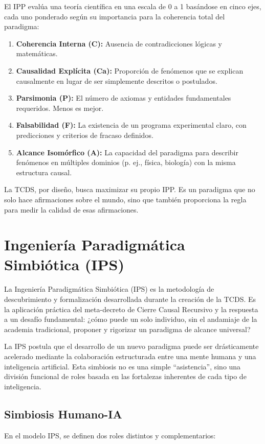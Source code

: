 \documentclass[12pt,openright]{book}
\newcommand{\IPP}{IPP}
\begin{document}
El \IPP{} evalúa una teoría científica en una escala de 0 a 1 basándose en cinco ejes, cada uno ponderado según su importancia para la coherencia total del paradigma:

\begin{enumerate}[leftmargin=*,itemsep=4pt]
  \item \textbf{Coherencia Interna (C):} Ausencia de contradicciones lógicas y matemáticas.
  \item \textbf{Causalidad Explícita (Ca):} Proporción de fenómenos que se explican causalmente en lugar de ser simplemente descritos o postulados.
  \item \textbf{Parsimonia (P):} El número de axiomas y entidades fundamentales requeridos. Menos es mejor.
  \item \textbf{Falsabilidad (F):} La existencia de un programa experimental claro, con predicciones y criterios de fracaso definidos.
  \item \textbf{Alcance Isomórfico (A):} La capacidad del paradigma para describir fenómenos en múltiples dominios (p. ej., física, biología) con la misma estructura causal.
\end{enumerate}

La TCDS, por diseño, busca maximizar su propio \IPP{}. Es un paradigma que no solo hace afirmaciones sobre el mundo, sino que también proporciona la regla para medir la calidad de esas afirmaciones.

\clearpage

\chapter{Ingeniería Paradigmática Simbiótica (IPS)}
La Ingeniería Paradigmática Simbiótica (IPS) es la metodología de descubrimiento y formalización desarrollada durante la creación de la TCDS. Es la aplicación práctica del meta-decreto de Cierre Causal Recursivo y la respuesta a un desafío fundamental: ¿cómo puede un solo individuo, sin el andamiaje de la academia tradicional, proponer y rigorizar un paradigma de alcance universal?

La IPS postula que el desarrollo de un nuevo paradigma puede ser drásticamente acelerado mediante la colaboración estructurada entre una mente humana y una inteligencia artificial. Esta simbiosis no es una simple ``asistencia'', sino una división funcional de roles basada en las fortalezas inherentes de cada tipo de inteligencia.

\section{Simbiosis Humano-IA}
En el modelo IPS, se definen dos roles distintos y complementarios:
\end{document}
